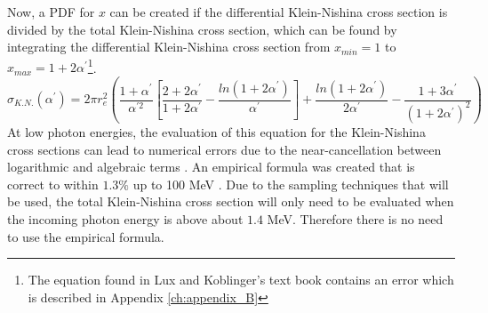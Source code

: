 Now, a PDF for $x$ can be created if the differential Klein-Nishina cross 
section is divided by the total Klein-Nishina cross section, which can be found 
by integrating the differential Klein-Nishina cross section from $x_{min} = 1$ to
$x_{max} = 1 + 2 \alpha^{'}$\footnote{The equation found in Lux and Koblinger's
text book contains an error which is described in Appendix \ref{ch:appendix_B}}.
\begin{equation}
  \sigma_{K.N.}(\alpha^{'}) = 2\pi r_e^2 \left( \frac{1+\alpha^{'}}{\alpha^{'2}}
  \left[\frac{2+2\alpha^{'}}{1+2\alpha^{'}} - 
    \frac{ln(1+2\alpha^{'})}{\alpha^{'}} \right]
  + \frac{ln(1+2\alpha^{'})}{2\alpha^{'}} - 
  \frac{1+3\alpha^{'}}{(1+2\alpha^{'})^2} \right)
\end{equation}
At low photon energies, the evaluation of this equation for the Klein-Nishina 
cross sections can lead to numerical errors due to the near-cancellation between
logarithmic and algebraic terms \citep{lux_monte_1991}. An empirical formula
was created that is correct to within $1.3\%$ up to 100 MeV
\citep{hastings_approximations_1955}. Due to the sampling techniques that will
be used, the total Klein-Nishina cross section will only need to be evaluated
when the incoming photon energy is above about $1.4$ MeV. Therefore there is no 
need to use the empirical formula.

